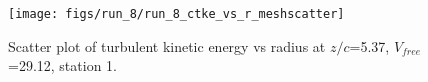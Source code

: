 \begin{figure}[H]
\centering
\texttt{[image: figs/run\_8/run\_8\_ctke\_vs\_r\_meshscatter]}
\caption{Scatter plot of turbulent kinetic energy vs radius at $z/c$=5.37, $V_{free}$=29.12, station 1.}
\label{fig:run_8_ctke_vs_r_meshscatter}
\end{figure}


